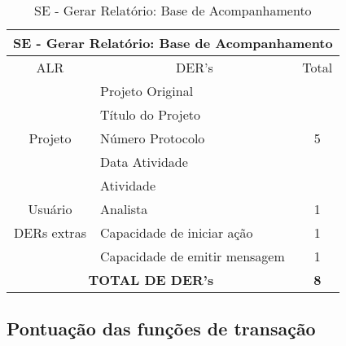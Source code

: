     \begin{table}[!h]
    \centering
    \caption{SE - Gerar Relatório: Base de Acompanhamento}
    \label{se_base_acompanhamento}
    \begin{tabular}{|c|l|c|}
    \hline
    \multicolumn{3}{|c|}{SE - Gerar Relatório: Base de Acompanhamento}            \\ \hline
    ALR                      & \multicolumn{1}{c|}{DER's}    & Total              \\ \hline
    \multirow{5}{*}{Projeto} & Projeto Original              & \multirow{5}{*}{5} \\ \cline{2-2}
			    & Título do Projeto             &                    \\ \cline{2-2}
			    & Número Protocolo              &                    \\ \cline{2-2}
			    & Data Atividade                &                    \\ \cline{2-2}
			    & Atividade                     &                    \\ \hline
    Usuário                  & Analista                      & 1                  \\ \hline
    DERs extras              & Capacidade de iniciar ação    & 1                  \\ \hline
    \multicolumn{1}{|l|}{}   & Capacidade de emitir mensagem & 1                  \\ \hline
    \multicolumn{2}{|c|}{\textbf{TOTAL DE DER's}}          & \textbf{8}         \\ \hline
    \end{tabular}
    \end{table}
      
   \pagebreak
   \subsection{Pontuação das funções de transação}
    

